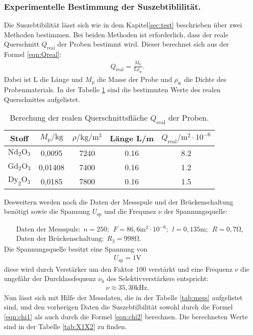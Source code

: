 \subsubsection{Experimentelle Bestimmung der Suszebtiblilität.}
Die Suszebtibilität lässt sich wie in dem Kapitel\ref{sec:test} beschrieben über zwei Methoden bestimmen. Bei beiden Methoden ist
erforderlich, dass der reale Querschnitt $Q_\mathrm{real}$ der Proben bestimmt wird.
Dieser berechnet sich aus der Formel \eqref{eqn:Qreal}:
\begin{align}
  Q_\mathrm{real}=\frac{M_\mathrm{p}}{L\rho_\mathrm{w}}\label{eqn:Qreal}.
\end{align}
Dabei ist L die Länge und $M_\mathrm{p}$ die Masse der Probe und
$\rho_\mathrm{w}$ die Dichte des Probenmaterials.
In der Tabelle \ref{tab:Q} sind die bestimmten Werte des realen Querschnittes aufgelistet.
\begin{table}
  \centering
  \caption{Berechung der realen Querschnittsfläche $Q_\mathrm{real}$ der Proben.}
  \label{tab:Q}
  \begin{tabular}{c c c c c}
  Stoff &  $M_\mathrm{p}/\si{\kilo\gram}$ & $\rho/\si{\kilo\gram\per\meter\tothe{3}}$ & Länge L/\si{\meter} & $Q_\mathrm{real}/\si{\meter\tothe{2}}\cdot 10^{-6}$\\
     \midrule
     $\mathrm{Nd_2O_3}$ & 0,0095  & 7240 & 0.16 & 8.2\\
     $\mathrm{Gd_2O_3}$ & 0,01408 & 7400 & 0.16 & 1.2\\
     $\mathrm{Dy_2O_3}$ & 0,0185  & 7800 & 0.16 & 1.5\\
     \bottomrule
  \end{tabular}
\end{table}
\FloatBarrier
Desweitern werden noch die Daten der Messspule und der Brückenschaltung benötigt sowie
die Spannung $U_\mathrm{sp}$ und die Frequnez $\nu$ der Spannungsquelle:

\begin{align*}
&\text{Daten der Messspule:}  \ \ n=250; \  \ F=86,6\si{\meter\tothe{2}}\cdot10^{-6}; \ \ l=0,135\si{\meter}; \ \ R= 0,7\si{\ohm}, \\
&\text{Daten der Brückenschaltung:} \ \  R_3=998\si{\ohm}.\
\end{align*}
Die Spannungsquelle besitzt eine Spannung von
\begin{align*}
U_\mathrm{sp}=1\si{\volt}
\end{align*}
diese wird durch Verstärker um den Faktor $100$ verstärkt
und eine Frequenz $\nu$ die ungefähr der Durchlassfequenz $\nu_0$
des Selektivverstärkers entspricht:
\begin{align*}
\nu\approx35,30\si{\kilo\hertz}.
\end{align*}
Nun lässt sich mit Hilfe der Messdaten, die in der Tabelle \ref{tab:mess}
aufgelistet sind, und den vorherigen Daten
die Suszebtilbilität \chi sowohl durch die Formel \eqref{eqn:chi1}
als auch  durch die Formel \eqref{eqn:chi2} berechnen.
Die berechneten Werte sind in der Tabelle \ref{tab:X1X2}
zu finden.

